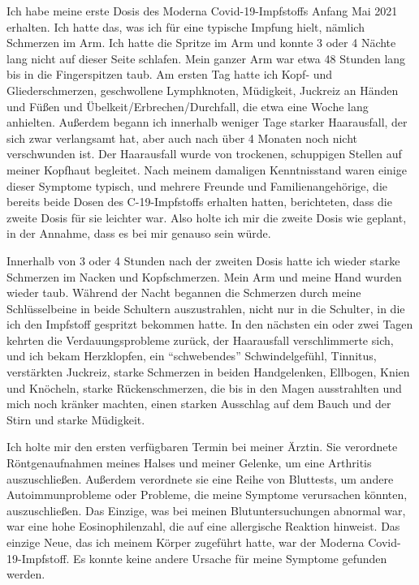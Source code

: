 Ich habe meine erste Dosis des Moderna Covid-19-Impfstoffs Anfang Mai 2021
erhalten. Ich hatte das, was ich für eine typische Impfung hielt, nämlich
Schmerzen im Arm. Ich hatte die Spritze im Arm und konnte 3 oder 4 Nächte lang
nicht auf dieser Seite schlafen. Mein ganzer Arm war etwa 48 Stunden lang bis in
die Fingerspitzen taub. Am ersten Tag hatte ich Kopf- und Gliederschmerzen,
geschwollene Lymphknoten, Müdigkeit, Juckreiz an Händen und Füßen und
Übelkeit/Erbrechen/Durchfall, die etwa eine Woche lang anhielten. Außerdem
begann ich innerhalb weniger Tage starker Haarausfall, der sich zwar verlangsamt
hat, aber auch nach über 4 Monaten noch nicht verschwunden ist. Der Haarausfall
wurde von trockenen, schuppigen Stellen auf meiner Kopfhaut begleitet. Nach
meinem damaligen Kenntnisstand waren einige dieser Symptome typisch, und mehrere
Freunde und Familienangehörige, die bereits beide Dosen des C-19-Impfstoffs
erhalten hatten, berichteten, dass die zweite Dosis für sie leichter war. Also
holte ich mir die zweite Dosis wie geplant, in der Annahme, dass es bei mir
genauso sein würde.

Innerhalb von 3 oder 4 Stunden nach der zweiten Dosis hatte ich wieder starke
Schmerzen im Nacken und Kopfschmerzen. Mein Arm und meine Hand wurden wieder
taub. Während der Nacht begannen die Schmerzen durch meine Schlüsselbeine in
beide Schultern auszustrahlen, nicht nur in die Schulter, in die ich den
Impfstoff gespritzt bekommen hatte. In den nächsten ein oder zwei Tagen kehrten
die Verdauungsprobleme zurück, der Haarausfall verschlimmerte sich, und ich
bekam Herzklopfen, ein “schwebendes” Schwindelgefühl, Tinnitus, verstärkten
Juckreiz, starke Schmerzen in beiden Handgelenken, Ellbogen, Knien und Knöcheln,
starke Rückenschmerzen, die bis in den Magen ausstrahlten und mich noch kränker
machten, einen starken Ausschlag auf dem Bauch und der Stirn und starke
Müdigkeit.

Ich holte mir den ersten verfügbaren Termin bei meiner Ärztin. Sie verordnete
Röntgenaufnahmen meines Halses und meiner Gelenke, um eine Arthritis
auszuschließen. Außerdem verordnete sie eine Reihe von Bluttests, um andere
Autoimmunprobleme oder Probleme, die meine Symptome verursachen könnten,
auszuschließen. Das Einzige, was bei meinen Blutuntersuchungen abnormal war, war
eine hohe Eosinophilenzahl, die auf eine allergische Reaktion hinweist. Das
einzige Neue, das ich meinem Körper zugeführt hatte, war der Moderna
Covid-19-Impfstoff. Es konnte keine andere Ursache für meine Symptome gefunden
werden.

